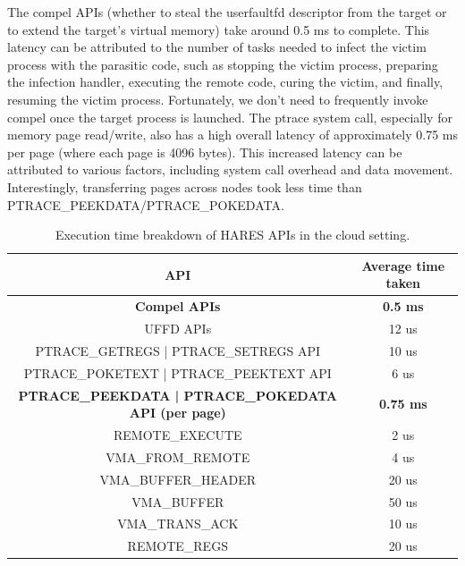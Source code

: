 \documentclass[article, doublespace,nopageskip]{VTthesis} %
\newcommand{\monitor}{HARES }
\begin{document}
    The compel APIs (whether to steal the userfaultfd descriptor from the target or to extend the target’s virtual memory) take around 0.5 ms to complete. This latency can be attributed to the number of tasks needed to infect the victim process with the parasitic code, such as stopping the victim process, preparing the infection handler, executing the remote code, curing the victim, and finally, resuming the victim process. Fortunately, we don’t need to frequently invoke compel once the target process is launched. The ptrace system call, especially for memory page read/write, also has a high overall latency of approximately 0.75 ms per page (where each page is 4096 bytes). This increased latency can be attributed to various factors, including system call overhead and data movement. Interestingly, transferring pages across nodes took less time than PTRACE\_PEEKDATA/PTRACE\_POKEDATA.

    \begin{table}[t]
    \centering
    \footnotesize
    \caption{Execution time breakdown of \monitor APIs in the cloud setting.}
    \begin{tabular}{| c | c |} \hline
          API & Average time taken \\ \hline \hline
        \textbf{Compel APIs}  &  \textbf{0.5 ms}\\ \hline
        UFFD APIs &  12 us \\ \hline
        PTRACE\_GETREGS | PTRACE\_SETREGS API  &  10 us\\  \hline
        PTRACE\_POKETEXT | PTRACE\_PEEKTEXT API & 6 us\\ \hline
        \textbf{PTRACE\_PEEKDATA | PTRACE\_POKEDATA API (per page)} & \textbf{0.75 ms} \\ \hline 
        REMOTE\_EXECUTE & 2 us \\ \hline
        VMA\_FROM\_REMOTE & 4 us \\ \hline
        VMA\_BUFFER\_HEADER & 20 us \\ \hline
        VMA\_BUFFER & 50 us \\ \hline
        VMA\_TRANS\_ACK & 10 us \\ \hline
        REMOTE\_REGS & 20 us \\ \hline
    \end{tabular}
    \label{t:TimeConsumingCalls}
    \end{table}
    
\end{document}
